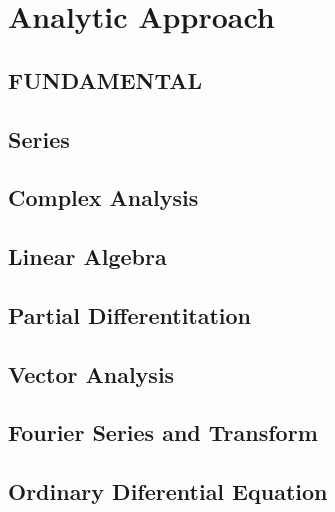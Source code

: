 \documentclass[10pt]{report}
\begin{document}
\pagestyle{empty}
\nocite{*}

\clearpage
\chapter{Analytic Approach}
\clearpage
\section{FUNDAMENTAL}
\thispagestyle{empty}

\clearpage
\section{Series}

\clearpage

\section{Complex Analysis}

\clearpage

\clearpage

\section{Linear Algebra}

\clearpage

\clearpage

\section{Partial Differentitation}

\clearpage

\clearpage

\section{Vector Analysis}

\clearpage

\section{Fourier Series and Transform}

\clearpage

\section{Ordinary Diferential Equation}

\clearpage

\clearpage

\clearpage

\clearpage
\end{document}
